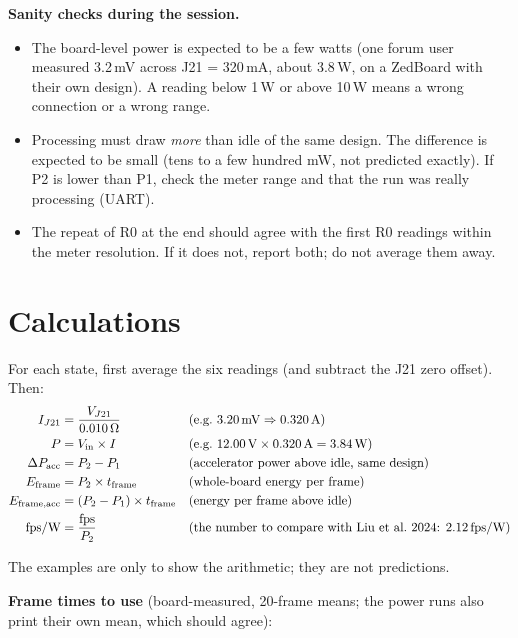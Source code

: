 \documentclass[11pt,a4paper]{article}
\begin{document}
\textbf{Sanity checks during the session.}
\begin{itemize}
  \item The board-level power is expected to be a few watts (one forum user measured 3.2\,mV across J21 = 320\,mA, about 3.8\,W, on a ZedBoard with their own design). A reading below 1\,W or above 10\,W means a wrong connection or a wrong range.
  \item Processing must draw \emph{more} than idle of the same design. The difference is expected to be small (tens to a few hundred mW, not predicted exactly). If P2 is lower than P1, check the meter range and that the run was really processing (UART).
  \item The repeat of R0 at the end should agree with the first R0 readings within the meter resolution. If it does not, report both; do not average them away.
\end{itemize}

\section{Calculations}\label{sec:calc}

For each state, first average the six readings (and subtract the J21 zero offset). Then:
\begin{align*}
I_{J21} &= \frac{V_{J21}}{0.010\,\Omega} &&\text{(e.g.\ 3.20\,mV} \Rightarrow 0.320\,\text{A)}\\
P &= V_\mathrm{in}\times I &&\text{(e.g.\ } 12.00\,\text{V} \times 0.320\,\text{A} = 3.84\,\text{W)}\\
\Delta P_\mathrm{acc} &= P_2 - P_1 &&\text{(accelerator power above idle, same design)}\\
E_\mathrm{frame} &= P_2 \times t_\mathrm{frame} &&\text{(whole-board energy per frame)}\\
E_\mathrm{frame,acc} &= (P_2 - P_1)\times t_\mathrm{frame} &&\text{(energy per frame above idle)}\\
\text{fps/W} &= \frac{\text{fps}}{P_2} &&\text{(the number to compare with Liu et al.\ 2024: 2.12\,fps/W)}
\end{align*}

The examples are only to show the arithmetic; they are not predictions.

\textbf{Frame times to use} (board-measured, 20-frame means; the power runs also print their own mean, which should agree):
\end{document}
